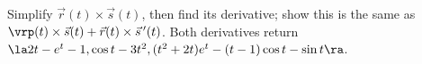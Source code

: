 {Simplify $\vec r(t)\times\vec s(t)$, then find its derivative; show this is the same as $\vrp(t)\times\vec s(t) + \vec r(t)\times\vec s\,'(t)$.
}
{
Both derivatives return $\la 2t-e^t-1,\cos t-3t^2,(t^2+2t)e^t-(t-1)\cos t-\sin t\ra$.
}

